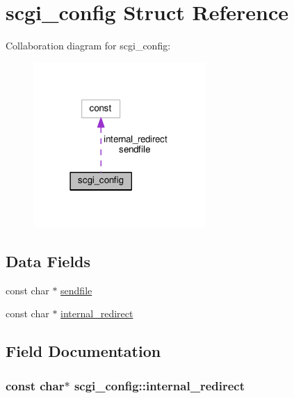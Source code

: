 \hypertarget{structscgi__config}{}\section{scgi\+\_\+config Struct Reference}
\label{structscgi__config}


Collaboration diagram for scgi\+\_\+config\+:
\nopagebreak
\begin{figure}[H]
\begin{center}
\leavevmode
\includegraphics[width=186pt]{structscgi__config__coll__graph}
\end{center}
\end{figure}
\subsection*{Data Fields}
\begin{DoxyCompactItemize}
\item 
const char $\ast$ \hyperlink{structscgi__config_a9d6141c0d3f8b85abcc2eafd61a65479}{sendfile}
\item 
const char $\ast$ \hyperlink{structscgi__config_a35817e61dc9af0b2efbd8f1b1fc17349}{internal\+\_\+redirect}
\end{DoxyCompactItemize}


\subsection{Field Documentation}
\subsubsection[{\texorpdfstring{internal\+\_\+redirect}{internal_redirect}}]{\setlength{\rightskip}{0pt plus 5cm}const char$\ast$ scgi\+\_\+config\+::internal\+\_\+redirect}\hypertarget{structscgi__config_a35817e61dc9af0b2efbd8f1b1fc17349}{}\label{structscgi__config_a35817e61dc9af0b2efbd8f1b1fc17349}
